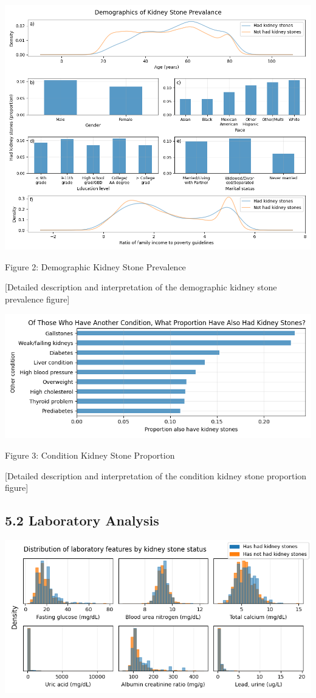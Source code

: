 \documentclass[
]{article}
\begin{document}
\includegraphics{../figures/demo_ks_prev.png}

Figure 2: Demographic Kidney Stone Prevalence

{[}Detailed description and interpretation of the demographic kidney
stone prevalence figure{]}

\includegraphics{../figures/cond_ks_prop.png}

Figure 3: Condition Kidney Stone Proportion

{[}Detailed description and interpretation of the condition kidney stone
proportion figure{]}

\hypertarget{laboratory-analysis}{%
\subsection{5.2 Laboratory Analysis}\label{laboratory-analysis}}

\includegraphics{../figures/lab_dist.png}
\end{document}
